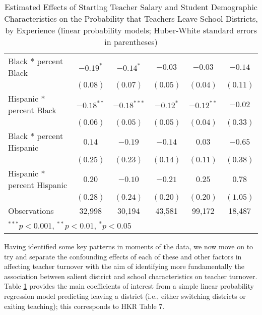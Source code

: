 \documentclass[12pt,]{article}
\begin{document}
\begin{table}
\begin{center}
\begin{tabular}{l c c c c c }
\quad Black * percent Black                 & $-0.19^{*}$  & $-0.14^{*}$   & $-0.03$       & $-0.03$      & $-0.14$      \\
                                            & $(0.08)$     & $(0.07)$      & $(0.05)$      & $(0.04)$     & $(0.11)$     \\
\quad Hispanic * percent Black              & $-0.18^{**}$ & $-0.18^{***}$ & $-0.12^{*}$   & $-0.12^{**}$ & $-0.02$      \\
                                            & $(0.06)$     & $(0.05)$      & $(0.05)$      & $(0.04)$     & $(0.33)$     \\
\quad Black * percent Hispanic              & $0.14$       & $-0.19$       & $-0.14$       & $0.03$       & $-0.65$      \\
                                            & $(0.25)$     & $(0.23)$      & $(0.14)$      & $(0.11)$     & $(0.38)$     \\
\quad Hispanic * percent Hispanic           & $0.20$       & $-0.10$       & $-0.21$       & $0.25$       & $0.78$       \\
                                            & $(0.28)$     & $(0.24)$      & $(0.20)$      & $(0.20)$     & $(1.05)$     \\
\hline
Observations                                & 32,998        & 30,194         & 43,581         & 99,172        & 18,487        \\
\hline
\multicolumn{6}{l}{\scriptsize{$^{***}p<0.001$, $^{**}p<0.01$, $^*p<0.05$}}
\end{tabular}
\caption{Estimated Effects of Starting Teacher Salary and Student Demographic Characteristics on the Probability that Teachers Leave School Districts, by Experience (linear probability models; Huber-White standard  errors in parentheses)}
\label{tbl:reg_lpm}
\end{center}
\end{table}

Having identified some key patterns in moments of the data, we now move
on to try and separate the confounding effects of each of these and
other factors in affecting teacher turnover with the aim of identifying
more fundamentally the association between salient district and school
characteristics on teacher turnover. Table \ref{tbl:reg_lpm} provides
the main coefficients of interest from a simple linear probability
regression model predicting leaving a district (i.e., either switching
districts or exiting teaching); this corresponds to HKR Table 7.
\end{document}
